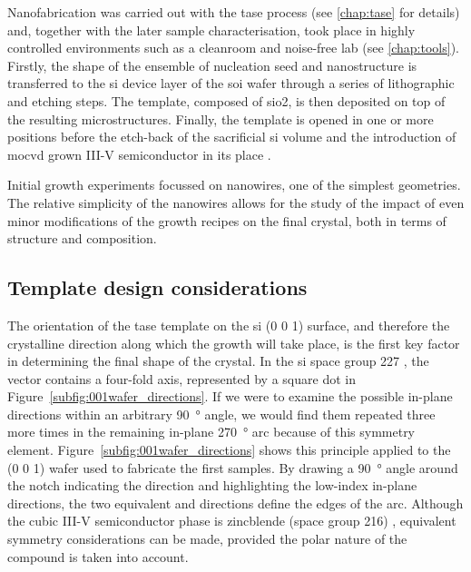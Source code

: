 Nanofabrication was carried out with the \acs{tase} process (see \autoref{chap:tase} for details) and, together with the later sample characterisation, took place in highly controlled environments such as a cleanroom and noise-free lab (see \autoref{chap:tools}). Firstly, the shape of the ensemble of nucleation seed and nanostructure is transferred to the \acl{si} device layer of the \acs{soi} wafer through a series of lithographic and etching steps. The template, composed of \acs{sio2}, is then deposited on top of the resulting microstructures. Finally, the template is opened in one or more positions before the etch-back of the sacrificial \acl{si} volume and the introduction of \acf{mocvd} grown III-V semiconductor in its place \cite{Schmid2015, borgTASEp2018}.

Initial growth experiments focussed on nanowires, one of the simplest geometries. The relative simplicity of the nanowires allows for the study of the impact of even minor modifications of the growth recipes on the final crystal, both in terms of structure and composition.

\subsection{Template design considerations}

The orientation of the \acs{tase} template on the \acl{si} \hkl(0 0 1) surface, and therefore the crystalline direction along which the growth will take place, is the first key factor in determining the final shape of the crystal. In the \acl{si} space group \num{227} \cite{osti_si}, the  vector contains a four-fold axis, represented by a square dot in Figure~\ref{subfig:001wafer_directions}. If we were to examine the possible in-plane directions within an arbitrary \qty{90}{\degree} angle, we would find them repeated three more times in the remaining in-plane \qty{270}{\degree} arc because of this symmetry element. Figure~\ref{subfig:001wafer_directions} shows this principle applied to the \hkl(0 0 1) wafer used to fabricate the first samples. By drawing a \qty{90}{\degree} angle around the notch indicating the \hkl[1 1 0] direction and highlighting the low-index in-plane directions, the two equivalent \hkl[0 1 0] and \hkl[1 0 0] directions define the edges of the arc. Although the cubic III-V semiconductor phase is zincblende (space group \num{216}) \cite{wyckoff1963crystal, osti_gaas_zb, osti_inas_zb, osti_inp_zb}, equivalent symmetry considerations can be made, provided the polar nature of the compound is taken into account.

